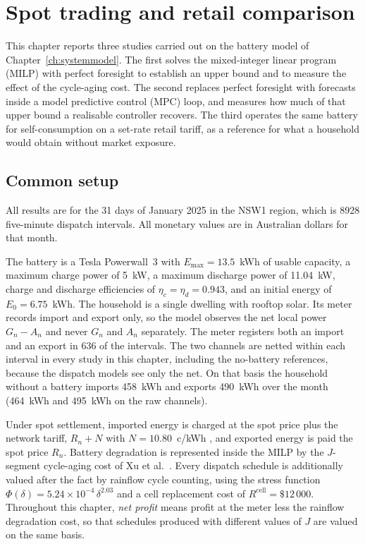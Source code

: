 \section{Spot trading and retail comparison}
\label{sec:results:trading}

This chapter reports three studies carried out on the battery model of
Chapter~\ref{ch:systemmodel}.
The first solves the mixed-integer linear program (MILP) with perfect foresight to
establish an upper bound and to measure the effect of the cycle-aging cost. The second
replaces perfect foresight with forecasts inside a model predictive control (MPC) loop,
and measures how much of that upper bound a realisable controller recovers. The third
operates the same battery for self-consumption on a set-rate retail tariff, as a
reference for what a household would obtain without market exposure.

\subsection{Common setup}
\label{sec:results:setup}

All results are for the 31 days of January 2025 in the NSW1 region, which is 8928
five-minute dispatch intervals. All monetary values are in Australian dollars for that
month.

The battery is a Tesla Powerwall~3 with $E_{\max} = 13.5$~kWh of usable capacity, a
maximum charge power of 5~kW, a maximum discharge power of 11.04~kW, charge and
discharge efficiencies of $\eta_c = \eta_d = 0.943$, and an initial energy of
$E_0 = 6.75$~kWh. The household is a single dwelling with rooftop solar. Its meter
records import and export only, so the model observes the net local power
$G_n - A_n$ and never $G_n$ and $A_n$ separately. The meter registers both an import
and an export in 636 of the intervals. The two channels are netted within each
interval in every study in this chapter, including the no-battery references, because
the dispatch models see only the net. On that basis the household without a battery
imports 458~kWh and exports 490~kWh over the month (464~kWh and 495~kWh on the raw
channels).

Under spot settlement, imported energy is charged at the spot price plus the network
tariff, $R_n + N$ with $N = 10.80$~c/kWh \cite{ausgrid2024networkpricelist},
and exported energy is paid the spot price $R_n$. Battery degradation is represented
inside the MILP by the $J$-segment cycle-aging cost of Xu et al.~\cite{Xu2018}.
Every dispatch schedule is additionally valued after the fact by rainflow cycle counting,
using the stress function $\Phi(\delta) = 5.24\times10^{-4}\,\delta^{2.03}$ and a cell
replacement cost of $R^{\mathrm{cell}} = \$12\,000$. Throughout this chapter, \emph{net
profit} means profit at the meter less the rainflow degradation cost, so that schedules
produced with different values of $J$ are valued on the same basis.

